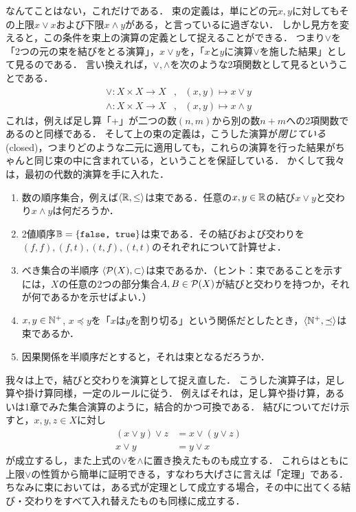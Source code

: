 \documentclass[11pt,a4paper, dvipdfmx]{jsarticle}
\begin{document}
なんてことはない，これだけである．
束の定義は，単にどの元$x, y$に対してもその上限$x \vee x$および下限$x \wedge y$がある，と言っているに過ぎない．
しかし見方を変えると，この条件を束上の演算の定義として捉えることができる．
つまり$\vee$を「2つの元の束を結びをとる演算」，$x \vee y$を，「$x$と$y$に演算$\vee$を施した結果」として見るのである．
言い換えれば，$\vee, \wedge$を次のような2項関数として見るということである．
\begin{align*}
 \vee: X \times X \to X &, \ \ \ (x, y) \mapsto x \vee y \\
 \wedge: X \times X \to X &, \ \ \ (x, y) \mapsto x \wedge y 
\end{align*}
これは，例えば足し算「+」が二つの数$(n, m)$から別の数$n + m$への2項関数であるのと同様である．
そして上の束の定義は，こうした演算が\emph{閉じている}(closed)，つまりどのような二元に適用しても，これらの演算を行った結果がちゃんと同じ束の中に含まれている，ということを保証している．
かくして我々は，最初の代数的演算を手に入れた．

\begin{exercise}
\begin{enumerate}
 \item 数の順序集合，例えば$\langle \mathbb{R}, \leq \rangle$は束である．任意の$x, y \in \mathbb{R}$の結び$x \vee y$と交わり$x \wedge y$は何だろうか．
 \item 2値順序$\mathbb{B} = \{ \texttt{false, true} \}$は束である．その結びおよび交わりを$(f, f), (f, t), (t, f), (t, t)$のそれぞれについて計算せよ．
 \item べき集合の半順序 $\langle \mathcal{P}(X), \subset \rangle$は束であるか．（ヒント：束であることを示すには，$X$の任意の2つの部分集合$A, B \in \mathcal{P}(X)$が結びと交わりを持つか，それが何であるかを示せばよい．）
 \item $x, y \in \mathbb{N}^+$, $x \preceq y$を「$x$は$y$を割り切る」という関係だとしたとき，$\langle \mathbb{N}^+, \preceq \rangle$は束であるか．
 \item 因果関係を半順序だとすると，それは束となるだろうか．
\end{enumerate}
 \end{exercise}

我々は上で，結びと交わりを演算として捉え直した．
こうした演算子は，足し算や掛け算同様，一定のルールに従う．
例えばそれは，足し算や掛け算，あるいは1章でみた集合演算のように，結合的かつ可換である．
結びについてだけ示すと，$x, y, z \in X$に対し
\begin{align}
(x \vee y) \vee z &= x \vee (y \vee z) \\
x \vee y &= y \vee x
\end{align}
が成立するし，また上式の$\vee$を$\wedge$に置き換えたものも成立する．
これらはともに上限$\vee$の性質から簡単に証明できる，すなわち大げさに言えば「定理」である．
ちなみに束においては，ある式が定理として成立する場合，その中に出てくる結び・交わりをすべて入れ替えたものも同様に成立する．
\end{document}
